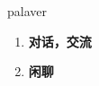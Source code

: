 
\begin{frame}
{\huge palaver}
\begin{center}
\begin{enumerate}\Large
  \item \textbf{对话，交流}
  \item \textbf{闲聊}
\end{enumerate}
\end{center}
\end{frame}
